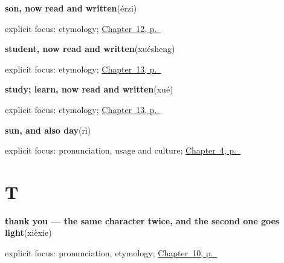 \noindent\begin{minipage}[t]{\linewidth}
\raggedright
\textbf{son, now read and written}\enspace\emph{}\enspace(érzi)\par
\footnotesize explicit focus: etymology; \hyperref[ch:zh-family-six]{Chapter~12, p.~\pageref*{ch:zh-family-six}}
\end{minipage}\par\smallskip

\noindent\begin{minipage}[t]{\linewidth}
\raggedright
\textbf{student, now read and written}\enspace\emph{}\enspace(xuésheng)\par
\footnotesize explicit focus: etymology; \hyperref[ch:zh-school-six]{Chapter~13, p.~\pageref*{ch:zh-school-six}}
\end{minipage}\par\smallskip

\noindent\begin{minipage}[t]{\linewidth}
\raggedright
\textbf{study; learn, now read and written}\enspace\emph{}\enspace(xué)\par
\footnotesize explicit focus: etymology; \hyperref[ch:zh-school-six]{Chapter~13, p.~\pageref*{ch:zh-school-six}}
\end{minipage}\par\smallskip

\noindent\begin{minipage}[t]{\linewidth}
\raggedright
\textbf{sun, and also day}\enspace\emph{}\enspace(rì)\par
\footnotesize explicit focus: pronunciation, usage and culture; \hyperref[ch:zh-negation]{Chapter~4, p.~\pageref*{ch:zh-negation}}
\end{minipage}\par\smallskip

\section*{T}

\noindent\begin{minipage}[t]{\linewidth}
\raggedright
\textbf{thank you — the same character twice, and the second one goes light}\enspace\emph{}\enspace(xièxie)\par
\footnotesize explicit focus: pronunciation, etymology; \hyperref[ch:zh-xiexie]{Chapter~10, p.~\pageref*{ch:zh-xiexie}}
\end{minipage}\par\smallskip

